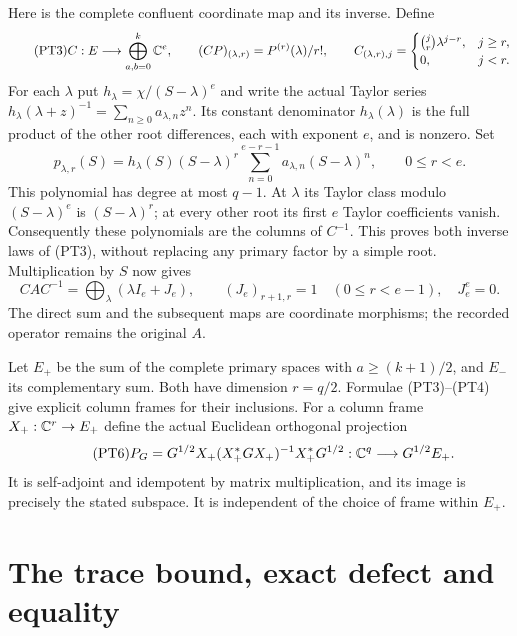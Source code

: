 \documentclass[11pt,a4paper]{article}
\begin{document}
Here is the complete confluent coordinate map and its inverse. Define
\begin{equation}\tag{PT3}
 C:E\longrightarrow\bigoplus_{a,b=0}^k\mathbb C^e,\qquad
 (CP)_{(\lambda,r)}=P^{(r)}(\lambda)/r!,\qquad
 C_{(\lambda,r),j}=\begin{cases}\binom jr\lambda^{j-r},&j\ge r,\\0,&j<r.
 \end{cases}
\end{equation}
For each \(\lambda\) put \(h_\lambda=\chi/(S-\lambda)^e\) and
write the actual Taylor series
\(h_\lambda(\lambda+z)^{-1}=\sum_{n\ge0}a_{\lambda,n}z^n\).
Its constant denominator \(h_\lambda(\lambda)\) is the full product
of the other root differences, each with exponent \(e\), and is
nonzero. Set
\begin{equation}\tag{PT4}
 p_{\lambda,r}(S)=h_\lambda(S)(S-\lambda)^r
       \sum_{n=0}^{e-r-1}a_{\lambda,n}(S-\lambda)^n,
 \qquad0\le r<e.
\end{equation}
This polynomial has degree at most \(q-1\). At \(\lambda\) its
Taylor class modulo \((S-\lambda)^e\) is \((S-\lambda)^r\);
at every other root its first \(e\) Taylor coefficients vanish.
Consequently these polynomials are the columns of \(C^{-1}\).
This proves both inverse laws of (PT3), without replacing any primary
factor by a simple root. Multiplication by \(S\) now gives
\begin{equation}\tag{PT5}
 CAC^{-1}=\bigoplus_\lambda(\lambda I_e+J_e),\qquad
 (J_e)_{r+1,r}=1\quad(0\le r<e-1),\quad J_e^e=0.
\end{equation}
The direct sum and the subsequent maps are coordinate morphisms;
the recorded operator remains the original \(A\).

Let \(E_+\) be the sum of the complete primary spaces with
\(a\ge(k+1)/2\), and \(E_-\) its complementary sum. Both have
dimension \(r=q/2\). Formulae (PT3)--(PT4) give explicit column
frames for their inclusions. For a column frame \(X_+:\mathbb C^r\to E_+\)
define the actual Euclidean orthogonal projection
\begin{equation}\tag{PT6}
 P_G=G^{1/2}X_+(X_+^*GX_+)^{-1}X_+^*G^{1/2}
       :\mathbb C^q\longrightarrow G^{1/2}E_+.
\end{equation}
It is self-adjoint and idempotent by matrix multiplication, and its
image is precisely the stated subspace. It is independent of the
choice of frame within \(E_+\).

\section{The trace bound, exact defect and equality}
\end{document}
